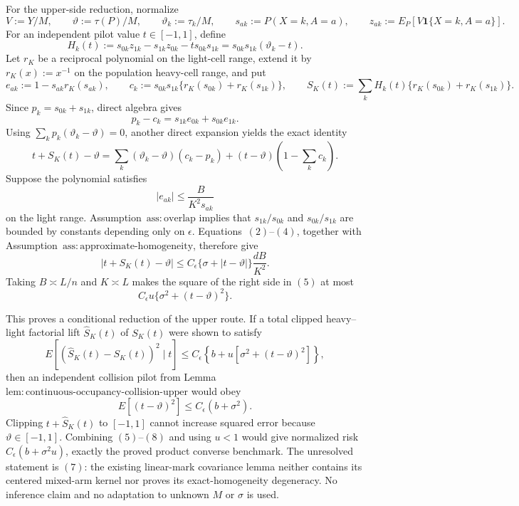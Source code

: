 For the upper-side reduction, normalize
\[
 V:=Y/M,\qquad \vartheta:=\tau(P)/M,\qquad
 \vartheta_k:=\tau_k/M,\qquad
 s_{ak}:=P(X=k,A=a),\qquad
 z_{ak}:=E_P[V\mathbf 1\{X=k,A=a\}].
\]
For an independent pilot value \(t\in[-1,1]\), define
\[
 H_k(t):=s_{0k}z_{1k}-s_{1k}z_{0k}-t s_{0k}s_{1k}
 =s_{0k}s_{1k}(\vartheta_k-t).
\]
Let \(r_K\) be a reciprocal polynomial on the light-cell range, extend it by \(r_K(x):=x^{-1}\) on the population heavy-cell range, and put
\[
 e_{ak}:=1-s_{ak}r_K(s_{ak}),\qquad
 c_k:=s_{0k}s_{1k}\{r_K(s_{0k})+r_K(s_{1k})\},
 \qquad
 S_K(t):=\sum_kH_k(t)\{r_K(s_{0k})+r_K(s_{1k})\}.
\]
Since \(p_k=s_{0k}+s_{1k}\), direct algebra gives
\[
 p_k-c_k=s_{1k}e_{0k}+s_{0k}e_{1k}.
\tag{2}
\]
Using \(\sum_kp_k(\vartheta_k-\vartheta)=0\), another direct expansion yields the exact identity
\[
 t+S_K(t)-\vartheta
 =\sum_k(\vartheta_k-\vartheta)(c_k-p_k)
 +(t-\vartheta)\left(1-\sum_kc_k\right).
\tag{3}
\]
Suppose the polynomial satisfies
\[
 |e_{ak}|\le \frac{B}{K^2s_{ak}}
\tag{4}
\]
on the light range.  Assumption~\(\mathrm{ass:overlap}\) implies that \(s_{1k}/s_{0k}\) and \(s_{0k}/s_{1k}\) are bounded by constants depending only on \(\epsilon\).  Equations~\((2)\)--\((4)\), together with Assumption~\(\mathrm{ass:approximate\text{-}homogeneity}\), therefore give
\[
 |t+S_K(t)-\vartheta|
 \le C_{\epsilon}\{\sigma+|t-\vartheta|\}\frac{dB}{K^2}.
\tag{5}
\]
Taking \(B\asymp L/n\) and \(K\asymp L\) makes the square of the right side in \((5)\) at most
\[
 C_{\epsilon}u\{\sigma^2+(t-\vartheta)^2\}.
\tag{6}
\]

This proves a conditional reduction of the upper route.  If a total clipped heavy--light factorial lift \(\widehat S_K(t)\) of \(S_K(t)\) were shown to satisfy
\[
 E[(\widehat S_K(t)-S_K(t))^2\mid t]
 \le C_{\epsilon}\left\{b+u[\sigma^2+(t-\vartheta)^2]\right\},
\tag{7}
\]
then an independent collision pilot from Lemma~\(\mathrm{lem:continuous\text{-}occupancy\text{-}collision\text{-}upper}\) would obey
\[
 E[(t-\vartheta)^2]\le C_{\epsilon}(b+\sigma^2).
\tag{8}
\]
Clipping \(t+\widehat S_K(t)\) to \([-1,1]\) cannot increase squared error because \(\vartheta\in[-1,1]\).  Combining \((5)\)--\((8)\) and using \(u<1\) would give normalized risk \(C_{\epsilon}(b+\sigma^2u)\), exactly the proved product converse benchmark.  The unresolved statement is \((7)\): the existing linear-mark covariance lemma neither contains its centered mixed-arm kernel nor proves its exact-homogeneity degeneracy.  No inference claim and no adaptation to unknown \(M\) or \(\sigma\) is used.